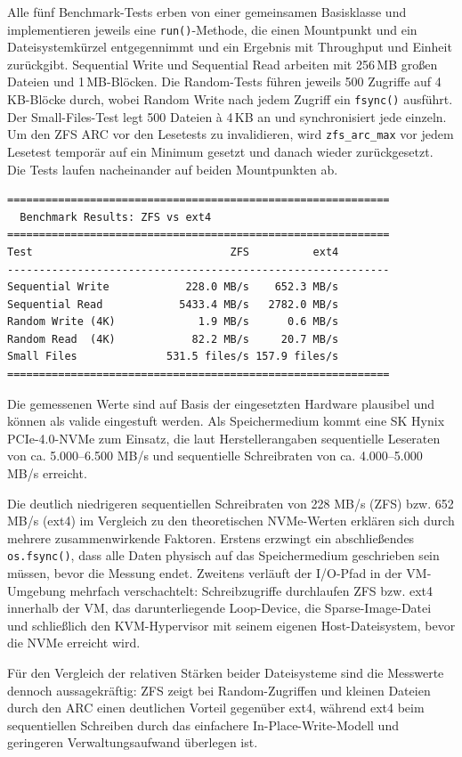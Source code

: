 \documentclass[a4paper, 12pt]{article}
\begin{document}
Alle fünf Benchmark-Tests erben von einer gemeinsamen Basisklasse und implementieren jeweils eine \texttt{run()}-Methode, die einen Mountpunkt und ein Dateisystemkürzel entgegennimmt und ein Ergebnis mit Throughput und Einheit zurückgibt. Sequential Write und Sequential Read arbeiten mit 256\,MB großen Dateien und 1\,MB-Blöcken. Die Random-Tests führen jeweils 500 Zugriffe auf 4\,KB-Blöcke durch, wobei Random Write nach jedem Zugriff ein \texttt{fsync()} ausführt. Der Small-Files-Test legt 500 Dateien à 4\,KB an und synchronisiert jede einzeln. Um den ZFS ARC vor den Lesetests zu invalidieren, wird \texttt{zfs\_arc\_max} vor jedem Lesetest temporär auf ein Minimum gesetzt und danach wieder zurückgesetzt. Die Tests laufen nacheinander auf beiden Mountpunkten ab.

\begin{lstlisting}
============================================================
  Benchmark Results: ZFS vs ext4
============================================================
Test                               ZFS          ext4
------------------------------------------------------------
Sequential Write            228.0 MB/s    652.3 MB/s
Sequential Read            5433.4 MB/s   2782.0 MB/s
Random Write (4K)             1.9 MB/s      0.6 MB/s
Random Read  (4K)            82.2 MB/s     20.7 MB/s
Small Files              531.5 files/s 157.9 files/s
============================================================
\end{lstlisting}

Die gemessenen Werte sind auf Basis der eingesetzten Hardware plausibel und können als valide eingestuft werden. Als Speichermedium kommt eine SK Hynix PCIe-4.0-NVMe zum Einsatz, die laut Herstellerangaben sequentielle Leseraten von ca. 5.000–6.500 MB/s und sequentielle Schreibraten von ca. 4.000–5.000 MB/s erreicht.

Die deutlich niedrigeren sequentiellen Schreibraten von 228 MB/s (ZFS) bzw. 652 MB/s (ext4) im Vergleich zu den theoretischen NVMe-Werten erklären sich durch mehrere zusammenwirkende Faktoren. Erstens erzwingt ein abschließendes \texttt{os.fsync()}, dass alle Daten physisch auf das Speichermedium geschrieben sein müssen, bevor die Messung endet. Zweitens verläuft der I/O-Pfad in der VM-Umgebung mehrfach verschachtelt: Schreibzugriffe durchlaufen ZFS bzw. ext4 innerhalb der VM, das darunterliegende Loop-Device, die Sparse-Image-Datei und schließlich den KVM-Hypervisor mit seinem eigenen Host-Dateisystem, bevor die NVMe erreicht wird.

Für den Vergleich der relativen Stärken beider Dateisysteme sind die Messwerte dennoch aussagekräftig: ZFS zeigt bei Random-Zugriffen und kleinen Dateien durch den ARC einen deutlichen Vorteil gegenüber ext4, während ext4 beim sequentiellen Schreiben durch das einfachere In-Place-Write-Modell und geringeren Verwaltungsaufwand überlegen ist.
\end{document}
